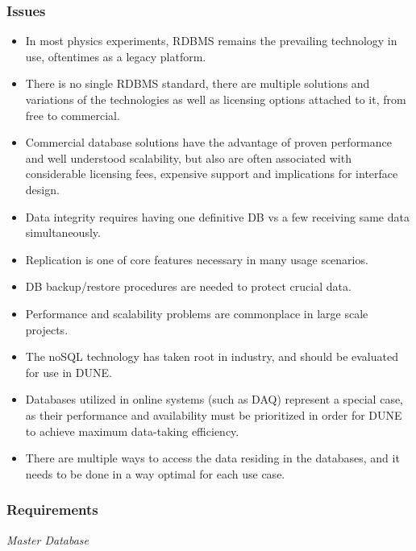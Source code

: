\subsubsection{Issues}
\begin{itemize}
\item In most physics experiments, RDBMS remains the prevailing technology in use, oftentimes as a legacy platform.
\item There is no single RDBMS standard, there are multiple solutions and variations of the technologies as well as licensing options attached to it, from free to commercial.
\item Commercial database solutions have the advantage of proven performance and well understood scalability, but also are often associated with considerable licensing fees, expensive support and implications for interface design.
\item Data  integrity requires having one definitive DB vs a few receiving same data simultaneously.
\item Replication is one of core features necessary in many usage scenarios.
\item DB backup/restore procedures are needed to protect crucial data.
\item Performance and scalability problems are commonplace in large scale projects.
\item The noSQL technology has taken root in industry, and should be evaluated for use in DUNE.
\item Databases utilized in online systems (such as DAQ) represent a special case, as their performance and availability must be prioritized in order for DUNE to achieve maximum data-taking efficiency.
\item There are multiple ways to access the data residing in the databases, and it needs to be done in a way optimal for each use case.
\end{itemize}

\subsubsection{Requirements}
\label{sec:req-db}
\textit{Master Database}

